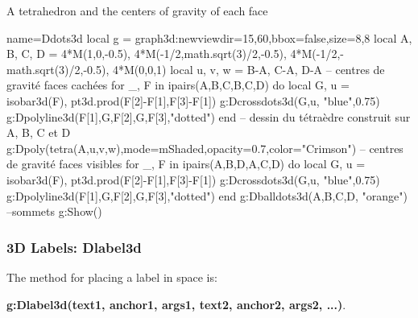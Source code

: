 \begin{demo}{A tetrahedron and the centers of gravity of each face}
\begin{luadraw}{name=Ddots3d}
local g = graph3d:new{viewdir={15,60},bbox=false,size={8,8}}
local A, B, C, D = 4*M(1,0,-0.5), 4*M(-1/2,math.sqrt(3)/2,-0.5), 4*M(-1/2,-math.sqrt(3)/2,-0.5), 4*M(0,0,1)
local u, v, w = B-A, C-A, D-A
-- centres de gravité faces cachées
for _, F in ipairs({{A,B,C},{B,C,D}}) do
    local G, u = isobar3d(F), pt3d.prod(F[2]-F[1],F[3]-F[1])
    g:Dcrossdots3d({G,u}, "blue",0.75)
    g:Dpolyline3d({{F[1],G,F[2]},{G,F[3]}},"dotted")
end
-- dessin du tétraèdre construit sur A, B, C et D
g:Dpoly(tetra(A,u,v,w),{mode=mShaded,opacity=0.7,color="Crimson"})
-- centres de gravité faces visibles
for _, F in ipairs({{A,B,D},{A,C,D}}) do
    local G, u = isobar3d(F), pt3d.prod(F[2]-F[1],F[3]-F[1])
    g:Dcrossdots3d({G,u}, "blue",0.75)
    g:Dpolyline3d({{F[1],G,F[2]},{G,F[3]}},"dotted")
end
g:Dballdots3d({A,B,C,D}, "orange") --sommets
g:Show()
\end{luadraw}
\end{demo}

\subsubsection{3D Labels: Dlabel3d}

The method for placing a label in space is:

\hfil\textbf{g:Dlabel3d(text1, anchor1, args1, text2, anchor2, args2, ...)}.\hfil

